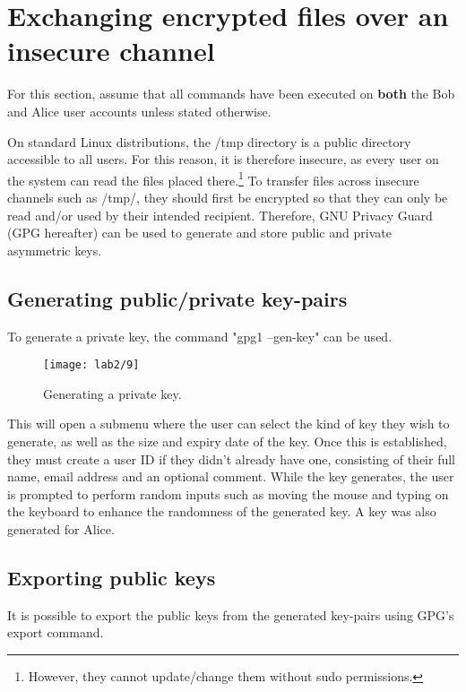 \section{Exchanging encrypted files over an insecure channel}\label{sec:tmpExchange}
\begin{tcolorbox}[colback=red!5!white,colframe=red!75!black]
    For this section, assume that all commands have been executed on \textbf{both} the Bob and Alice
    user accounts unless stated otherwise.
\end{tcolorbox}
On standard Linux distributions, the /tmp directory is a public directory accessible to all users.
For this reason, it is therefore insecure, as every user on the system can read the files placed there.\footnote{However, they cannot update/change them without sudo permissions.}
To transfer files across insecure channels such as /tmp/, they should first be encrypted so that
they can only be read and/or used by their intended recipient.
Therefore, GNU Privacy Guard (GPG hereafter) can be used to generate and store public
and private asymmetric keys.

\subsection{Generating public/private key-pairs}\label{subsec:generating-private-keys}

To generate a private key, the command "gpg1 --gen-key" can be used.

\begin{figure}[H]
    \centering
    \texttt{[image: lab2/9]}
    \caption{Generating a private key.}
    \label{fig:GPGgen}
\end{figure}

This will open a submenu where the user can select the kind of key they wish to generate,
as well as the size and expiry date of the key.
Once this is established, they must create a user ID if they didn't already have one,
consisting of their full name, email address and an optional comment.
While the key generates, the user is prompted to perform random inputs such as moving the mouse
and typing on the keyboard to enhance the randomness of the generated key.
A key was also generated for Alice.

\subsection{Exporting public keys}\label{subsec:exporting-public-keys}
It is possible to export the public keys from the generated key-pairs using GPG's export command.

